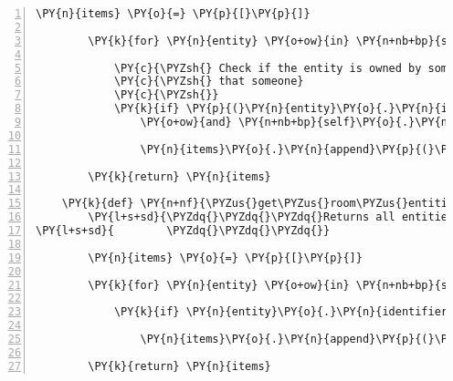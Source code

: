 \begin{Verbatim}[commandchars=\\\{\},numbers=left,firstnumber=1,stepnumber=1]
        \PY{n}{items} \PY{o}{=} \PY{p}{[}\PY{p}{]}

        \PY{k}{for} \PY{n}{entity} \PY{o+ow}{in} \PY{n+nb+bp}{self}\PY{o}{.}\PY{n}{host}\PY{o}{.}\PY{n}{rack}\PY{o}{.}\PY{n}{entity\PYZus{}dict}\PY{o}{.}\PY{n}{values}\PY{p}{(}\PY{p}{)}\PY{p}{:}

            \PY{c}{\PYZsh{} Check if the entity is owned by someone and if client is}
            \PY{c}{\PYZsh{} that someone}
            \PY{c}{\PYZsh{}}
            \PY{k}{if} \PY{p}{(}\PY{n}{entity}\PY{o}{.}\PY{n}{identifier} \PY{o+ow}{in} \PY{n+nb+bp}{self}\PY{o}{.}\PY{n}{host}\PY{o}{.}\PY{n}{rack}\PY{o}{.}\PY{n}{owner\PYZus{}dict}\PY{o}{.}\PY{n}{keys}\PY{p}{(}\PY{p}{)}
                \PY{o+ow}{and} \PY{n+nb+bp}{self}\PY{o}{.}\PY{n}{host}\PY{o}{.}\PY{n}{rack}\PY{o}{.}\PY{n}{owner\PYZus{}dict}\PY{p}{[}\PY{n}{entity}\PY{o}{.}\PY{n}{identifier}\PY{p}{]} \PY{o+ow}{is} \PY{n+nb+bp}{self}\PY{o}{.}\PY{n}{host}\PY{o}{.}\PY{n}{client\PYZus{}id}\PY{p}{)}\PY{p}{:}

                \PY{n}{items}\PY{o}{.}\PY{n}{append}\PY{p}{(}\PY{p}{(}\PY{n}{entity}\PY{p}{,} \PY{n}{entity}\PY{o}{.}\PY{n}{identifier}\PY{p}{)}\PY{p}{)}

        \PY{k}{return} \PY{n}{items}

    \PY{k}{def} \PY{n+nf}{\PYZus{}get\PYZus{}room\PYZus{}entities}\PY{p}{(}\PY{n+nb+bp}{self}\PY{p}{)}\PY{p}{:}
        \PY{l+s+sd}{\PYZdq{}\PYZdq{}\PYZdq{}Returns all entities in the room except for the client.}
\PY{l+s+sd}{        \PYZdq{}\PYZdq{}\PYZdq{}}

        \PY{n}{items} \PY{o}{=} \PY{p}{[}\PY{p}{]}

        \PY{k}{for} \PY{n}{entity} \PY{o+ow}{in} \PY{n+nb+bp}{self}\PY{o}{.}\PY{n}{host}\PY{o}{.}\PY{n}{room}\PY{o}{.}\PY{n}{entity\PYZus{}dict}\PY{o}{.}\PY{n}{values}\PY{p}{(}\PY{p}{)}\PY{p}{:}

            \PY{k}{if} \PY{n}{entity}\PY{o}{.}\PY{n}{identifier} \PY{o+ow}{is} \PY{o+ow}{not} \PY{n+nb+bp}{self}\PY{o}{.}\PY{n}{host}\PY{o}{.}\PY{n}{client\PYZus{}id}\PY{p}{:}

                \PY{n}{items}\PY{o}{.}\PY{n}{append}\PY{p}{(}\PY{p}{(}\PY{n}{entity}\PY{p}{,} \PY{n}{entity}\PY{o}{.}\PY{n}{identifier}\PY{p}{)}\PY{p}{)}

        \PY{k}{return} \PY{n}{items}
\end{Verbatim}
